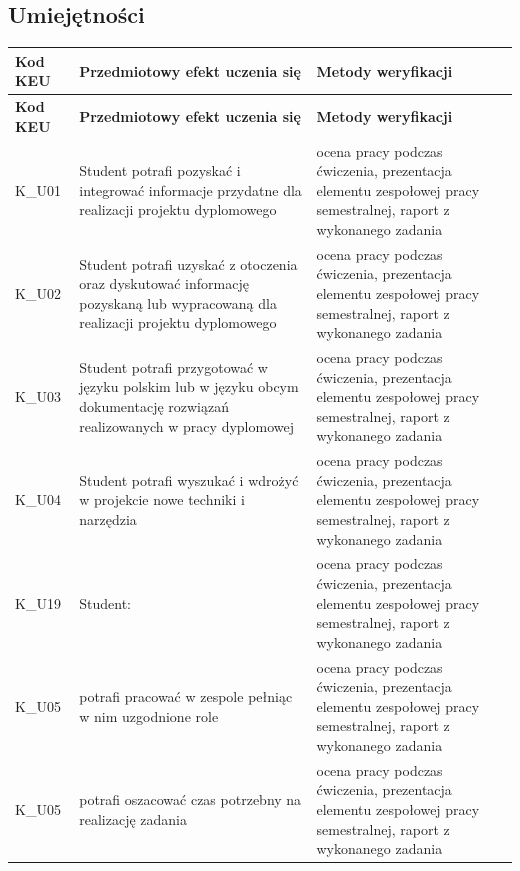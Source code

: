 \documentclass[12pt, a4paper]{article}
\newcommand{\thdrule}{\noalign{\global\setlength{\extrarowheight}{0pt}}}
\newcommand{\thdend}{\noalign{\global\setlength{\extrarowheight}{3pt}}}
\begin{document}
\subsection*{Umiejętności}
{\scriptsize
\begin{longtable}{m{1.6cm}m{9.0cm}m{4.2cm}}
\thdrule\toprule
\rowcolor{pjatkRed} {\color{white}\footnotesize\textbf{\vphantom{Ag}Kod KEU}} & {\color{white}\footnotesize\textbf{\vphantom{Ag}Przedmiotowy efekt uczenia się}} & {\color{white}\footnotesize\textbf{\vphantom{Ag}Metody weryfikacji}} \\
\midrule\thdend
\endfirsthead
\thdrule\toprule
\rowcolor{pjatkRed} {\color{white}\footnotesize\textbf{\vphantom{Ag}Kod KEU}} & {\color{white}\footnotesize\textbf{\vphantom{Ag}Przedmiotowy efekt uczenia się}} & {\color{white}\footnotesize\textbf{\vphantom{Ag}Metody weryfikacji}} \\
\midrule\thdend
\endhead
  \rowcolor{tableRowLight} K\_U01 & Student potrafi pozyskać i integrować informacje przydatne dla realizacji projektu dyplomowego & ocena pracy podczas ćwiczenia, prezentacja elementu zespołowej pracy semestralnej, raport z wykonanego zadania \\
  \rowcolor{tableRowAlt} K\_U02 & Student potrafi uzyskać z otoczenia oraz dyskutować informację pozyskaną lub wypracowaną dla realizacji projektu dyplomowego & ocena pracy podczas ćwiczenia, prezentacja elementu zespołowej pracy semestralnej, raport z wykonanego zadania \\
  \rowcolor{tableRowLight} K\_U03 & Student potrafi przygotować w języku polskim lub w języku obcym dokumentację rozwiązań realizowanych w pracy dyplomowej & ocena pracy podczas ćwiczenia, prezentacja elementu zespołowej pracy semestralnej, raport z wykonanego zadania \\
  \rowcolor{tableRowAlt} K\_U04 & Student potrafi wyszukać i wdrożyć w projekcie nowe techniki i narzędzia & ocena pracy podczas ćwiczenia, prezentacja elementu zespołowej pracy semestralnej, raport z wykonanego zadania \\
  \rowcolor{tableRowLight} K\_U19 & Student: & ocena pracy podczas ćwiczenia, prezentacja elementu zespołowej pracy semestralnej, raport z wykonanego zadania \\
  \rowcolor{tableRowAlt} K\_U05 & potrafi pracować w zespole pełniąc w nim uzgodnione role & ocena pracy podczas ćwiczenia, prezentacja elementu zespołowej pracy semestralnej, raport z wykonanego zadania \\
  \rowcolor{tableRowLight} K\_U05 & potrafi oszacować czas potrzebny na realizację zadania & ocena pracy podczas ćwiczenia, prezentacja elementu zespołowej pracy semestralnej, raport z wykonanego zadania \\

\end{longtable}}
\end{document}
